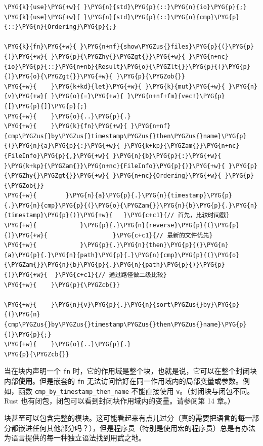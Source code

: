 \begin{Verbatim}[commandchars=\\\{\},breaklines=true,breakanywhere=true,fontsize=\codefont,xleftmargin=17bp]
\PYG{k}{use}\PYG{+w}{ }\PYG{n}{std}\PYG{p}{::}\PYG{n}{io}\PYG{p}{;}
\PYG{k}{use}\PYG{+w}{ }\PYG{n}{std}\PYG{p}{::}\PYG{n}{cmp}\PYG{p}{::}\PYG{n}{Ordering}\PYG{p}{;}

\PYG{k}{fn}\PYG{+w}{ }\PYG{n+nf}{show\PYGZus{}files}\PYG{p}{(}\PYG{p}{)}\PYG{+w}{ }\PYG{p}{\PYGZhy{}\PYGZgt{}}\PYG{+w}{ }\PYG{n+nc}{io}\PYG{p}{::}\PYG{n+nb}{Result}\PYG{o}{\PYGZlt{}}\PYG{p}{(}\PYG{p}{)}\PYG{o}{\PYGZgt{}}\PYG{+w}{ }\PYG{p}{\PYGZob{}}
\PYG{+w}{    }\PYG{k+kd}{let}\PYG{+w}{ }\PYG{k}{mut}\PYG{+w}{ }\PYG{n}{v}\PYG{+w}{ }\PYG{o}{=}\PYG{+w}{ }\PYG{n+nf+fm}{vec!}\PYG{p}{[}\PYG{p}{]}\PYG{p}{;}
\PYG{+w}{    }\PYG{o}{..}\PYG{p}{.}
\PYG{+w}{    }\PYG{k}{fn}\PYG{+w}{ }\PYG{n+nf}{cmp\PYGZus{}by\PYGZus{}timestamp\PYGZus{}then\PYGZus{}name}\PYG{p}{(}\PYG{n}{a}\PYG{p}{:}\PYG{+w}{ }\PYG{k+kp}{\PYGZam{}}\PYG{n+nc}{FileInfo}\PYG{p}{,}\PYG{+w}{ }\PYG{n}{b}\PYG{p}{:}\PYG{+w}{ }\PYG{k+kp}{\PYGZam{}}\PYG{n+nc}{FileInfo}\PYG{p}{)}\PYG{+w}{ }\PYG{p}{\PYGZhy{}\PYGZgt{}}\PYG{+w}{ }\PYG{n+nc}{Ordering}\PYG{+w}{ }\PYG{p}{\PYGZob{}}
\PYG{+w}{        }\PYG{n}{a}\PYG{p}{.}\PYG{n}{timestamp}\PYG{p}{.}\PYG{n}{cmp}\PYG{p}{(}\PYG{o}{\PYGZam{}}\PYG{n}{b}\PYG{p}{.}\PYG{n}{timestamp}\PYG{p}{)}\PYG{+w}{   }\PYG{c+c1}{// 首先，比较时间戳}
\PYG{+w}{            }\PYG{p}{.}\PYG{n}{reverse}\PYG{p}{(}\PYG{p}{)}\PYG{+w}{                  }\PYG{c+c1}{// 最新的文件优先}
\PYG{+w}{            }\PYG{p}{.}\PYG{n}{then}\PYG{p}{(}\PYG{n}{a}\PYG{p}{.}\PYG{n}{path}\PYG{p}{.}\PYG{n}{cmp}\PYG{p}{(}\PYG{o}{\PYGZam{}}\PYG{n}{b}\PYG{p}{.}\PYG{n}{path}\PYG{p}{)}\PYG{p}{)}\PYG{+w}{  }\PYG{c+c1}{// 通过路径做二级比较}
\PYG{+w}{    }\PYG{p}{\PYGZcb{}}

\PYG{+w}{    }\PYG{n}{v}\PYG{p}{.}\PYG{n}{sort\PYGZus{}by}\PYG{p}{(}\PYG{n}{cmp\PYGZus{}by\PYGZus{}timestamp\PYGZus{}then\PYGZus{}name}\PYG{p}{)}\PYG{p}{;}
\PYG{+w}{    }\PYG{o}{..}\PYG{p}{.}
\PYG{p}{\PYGZcb{}}
\end{Verbatim}

当在块内声明一个 \texttt{fn} 时，它的作用域是整个块，也就是说，它可以在整个封闭块内部\textbf{使用}。但是嵌套的 \texttt{fn} 无法访问恰好在同一作用域内的局部变量或参数。例如，函数 \texttt{cmp\_by\_timestamp\_then\_name} 不能直接使用 \texttt{v}。（封闭块与闭包不同。Rust 也有闭包，闭包可以看到封闭块作用域内的变量。请参阅第 14 章。）

块甚至可以包含完整的模块。这可能看起来有点儿过分（真的需要把语言的\textbf{每一}部分都嵌进任何其他部分吗？），但是程序员（特别是使用宏的程序员）总是有办法为语言提供的每一种独立语法找到用武之地。

